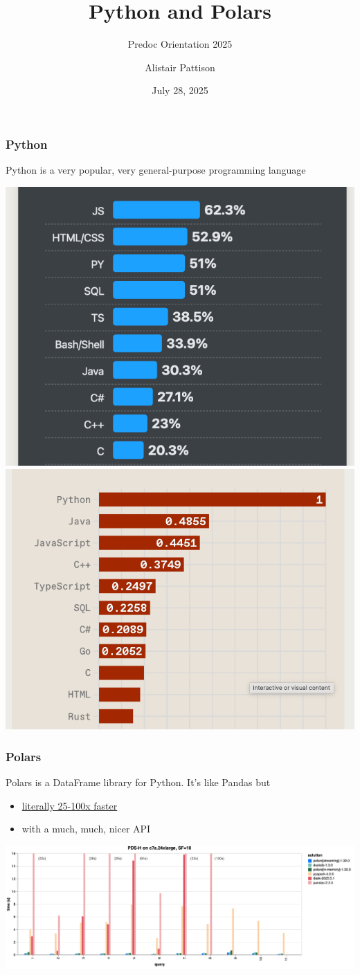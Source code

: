 \documentclass{ali-presentation}
\title{Python and Polars}
\subtitle{Predoc Orientation 2025}
\date{July 28, 2025}
\author{Alistair Pattison}
\begin{document}
\maketitle

\begin{frame}[t]
    \frametitle{Python}

    Python is a very popular, very general-purpose programming language

    \pause \centering \bigskip

    \includegraphics[width = .4 \textwidth]{figures/so-rank.png}
    \includegraphics[width = .4 \textwidth]{figures/ieee-rank.png}
\end{frame}

\begin{frame}[t]
    \frametitle{Polars}

    Polars is a DataFrame library for Python. It's like Pandas but
    \begin{itemize}
        \item \href{https://pola.rs/posts/benchmarks/}{literally 25-100x faster}
        \item with a much, much, nicer API
    \end{itemize}

    \pause \centering

    \includegraphics[width = \textwidth]{figures/benchmarks.png}
\end{frame}
\end{document}
